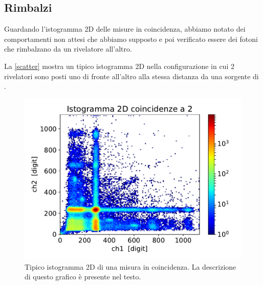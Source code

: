 \subsection{Rimbalzi}
Guardando l'istogramma 2D delle misure in coincidenza, abbiamo notato dei comportamenti non attesi che abbiamo supposto e poi verificato essere dei fotoni che rimbalzano da un rivelatore all'altro.

La \autoref{scatter} mostra un tipico istogramma 2D
nella configurazione in cui 2 rivelatori sono posti uno di fronte all'altro alla stessa distanza da una sorgente di \na{}.

\begin{figure}[h]
\centering
\includegraphics[width=\textwidth]{immagini/esempio}
\caption{Tipico istogramma 2D di una misura in coincidenza. La descrizione di questo grafico è presente nel testo.}
\label{scatter}
\end{figure}


